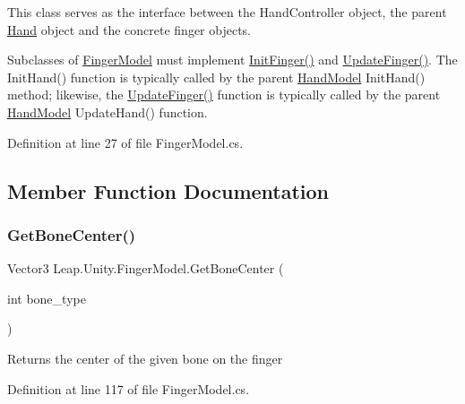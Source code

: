 This class serves as the interface between the Hand\+Controller object, the parent \mbox{\hyperlink{class_leap_1_1_hand}{Hand}} object and the concrete finger objects.

Subclasses of \mbox{\hyperlink{class_leap_1_1_unity_1_1_finger_model}{Finger\+Model}} must implement \mbox{\hyperlink{class_leap_1_1_unity_1_1_finger_model_a27b24f96e9e709625779cc24bd5d72f3}{Init\+Finger()}} and \mbox{\hyperlink{class_leap_1_1_unity_1_1_finger_model_a9103f063172a8f99a9aa083407ada2a2}{Update\+Finger()}}. The Init\+Hand() function is typically called by the parent \mbox{\hyperlink{class_leap_1_1_unity_1_1_hand_model}{Hand\+Model}} Init\+Hand() method; likewise, the \mbox{\hyperlink{class_leap_1_1_unity_1_1_finger_model_a9103f063172a8f99a9aa083407ada2a2}{Update\+Finger()}} function is typically called by the parent \mbox{\hyperlink{class_leap_1_1_unity_1_1_hand_model}{Hand\+Model}} Update\+Hand() function. 

Definition at line 27 of file Finger\+Model.\+cs.



\subsection{Member Function Documentation}
\mbox{\label{class_leap_1_1_unity_1_1_finger_model_a660b8448f1f9f6ea0b5ffe773b110925}} 
\subsubsection{\texorpdfstring{GetBoneCenter()}{GetBoneCenter()}}
{\footnotesize\ttfamily Vector3 Leap.\+Unity.\+Finger\+Model.\+Get\+Bone\+Center (\begin{DoxyParamCaption}\item[{int}]{bone\+\_\+type }\end{DoxyParamCaption})}

Returns the center of the given bone on the finger 

Definition at line 117 of file Finger\+Model.\+cs.

\mbox{\label{class_leap_1_1_unity_1_1_finger_model_a66f77c83bb90b02c1b46692d5f824ae3}} 
